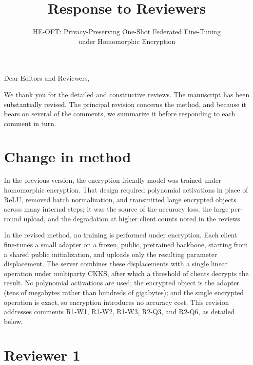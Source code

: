 \documentclass[11pt]{article}
\title{Response to Reviewers}
\author{HE-OFT: Privacy-Preserving One-Shot Federated Fine-Tuning\\under Homomorphic Encryption}
\date{}
\begin{document}
\maketitle

Dear Editors and Reviewers,

We thank you for the detailed and constructive reviews. The manuscript has been substantially revised. The
principal revision concerns the method, and because it bears on several of the comments, we summarize it
before responding to each comment in turn.

\section*{Change in method}

In the previous version, the encryption-friendly model was trained under homomorphic encryption. That design
required polynomial activations in place of ReLU, removed batch normalization, and transmitted large
encrypted objects across many internal steps; it was the source of the accuracy loss, the large per-round
upload, and the degradation at higher client counts noted in the reviews.

In the revised method, no training is performed under encryption. Each client fine-tunes a small adapter on a
frozen, public, pretrained backbone, starting from a shared public initialization, and uploads only the
resulting parameter displacement. The server combines these displacements with a single linear operation
under multiparty CKKS, after which a threshold of clients decrypts the result. No polynomial activations are
used; the encrypted object is the adapter (tens of megabytes rather than hundreds of gigabytes); and the
single encrypted operation is exact, so encryption introduces no accuracy cost. This revision addresses
comments R1-W1, R1-W2, R1-W3, R2-Q3, and R2-Q6, as detailed below.

\section*{Reviewer 1}
\end{document}

